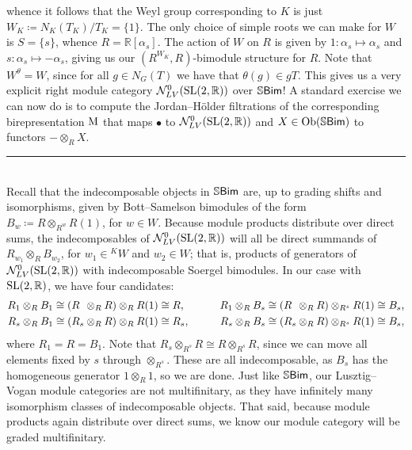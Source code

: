 \begin{example}
whence it follows that the Weyl group corresponding to $K$ is just $W_K \coloneqq N_K(T_K)/T_K = \{1\}$. The only choice of simple roots we can make for $W$ is $S = \{s\}$, whence $R = \mathbb{R}[\alpha_s]$. The action of $W$ on $R$ is given by $1 : \alpha_s \mapsto \alpha_s$ and $s : \alpha_s \mapsto -\alpha_s$, giving us our $(R^{W_K}, R)$-bimodule structure for $R$. Note that $W^\theta = W$, since for all $g \in N_G(T)$ we have that $\theta(g) \in gT$. This gives us a very explicit right module category $\mathcal{N}_{LV}^0(\textup{SL}(2, \mathbb{R}))$ over $\mathbb{S}\textnormal{\textsf{Bim}}$! A standard exercise we can now do is to compute the Jordan--H\"{o}lder filtrations of the corresponding birepresentation $\textup{M}$ that maps $\bullet$ to $\mathcal{N}_{LV}^0(\textup{SL}(2, \mathbb{R}))$ and $X \in \textnormal{Ob}(\mathbb{S}\textnormal{\textsf{Bim}})$ to functors $- \otimes_R X$.\\[-1.5\baselineskip]%
\begin{center}
\rule{0.5\linewidth}{1pt}
\end{center}
\noindent\\[-\baselineskip]
\noindent Recall that the indecomposable objects in $\mathbb{S}\textnormal{\textsf{Bim}}$ are, up to grading shifts and isomorphisms, given by Bott--Samelson bimodules of the form $B_w \coloneqq R \otimes_{R^w} R(1)$, for $w \in W$. Because module products distribute over direct sums, the indecomposables of $\mathcal{N}_{LV}^0(\textup{SL}(2, \mathbb{R}))$ will all be direct summands of $R_{w_1} \otimes_R B_{w_2}$, for $w_1 \in {}^KW$ and $w_2 \in W$; that is, products of generators of $\mathcal{N}_{LV}^0(\textup{SL}(2, \mathbb{R}))$ with indecomposable Soergel bimodules. In our case with $\textup{SL}(2, \mathbb{R})$, we have four candidates:
\begin{alignat*}{2}
R_1 \otimes_R B_1 \cong (R\hphantom{{}_{s}} \otimes_R R) \otimes_R R(1) &\cong R,&\qquad R_1 \otimes_R B_{s} \cong (R\hphantom{{}_{s}} \otimes_R R) \otimes_{R^{s}} R(1) &\cong B_{s},\\
R_{s} \otimes_R B_1 \cong (R_{s} \otimes_R R) \otimes_R R(1) &\cong R_{s},&\qquad R_{s} \otimes_R B_{s} \cong (R_{s} \otimes_R R) \otimes_{R^{s}} R(1) &\cong B_{s},
\end{alignat*}
\noindent where $R_1 = R = B_1$. Note that $R_s \otimes_{R^s} R \cong R \otimes_{R^s} R$, since we can move all elements fixed by $s$ through $\otimes_{R^s}$. These are all indecomposable, as $B_s$ has the homogeneous generator $1 \otimes_R 1$, so we are done. Just like $\mathbb{S}\textnormal{\textsf{Bim}}$, our Lusztig--Vogan module categories are not multifinitary, as they have infinitely many isomorphism classes of indecomposable objects. That said, because module products again distribute over direct sums, we know our module category will be graded multifinitary.\newpage %


\end{example}
